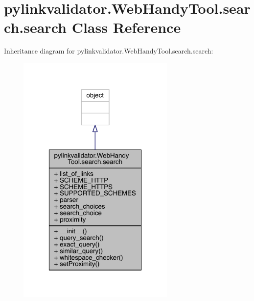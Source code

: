 \hypertarget{classpylinkvalidator_1_1_web_handy_tool_1_1search_1_1search}{}\section{pylinkvalidator.\+Web\+Handy\+Tool.\+search.\+search Class Reference}
\label{classpylinkvalidator_1_1_web_handy_tool_1_1search_1_1search}


Inheritance diagram for pylinkvalidator.\+Web\+Handy\+Tool.\+search.\+search\+:
\nopagebreak
\begin{figure}[H]
\begin{center}
\leavevmode
\includegraphics[width=220pt]{classpylinkvalidator_1_1_web_handy_tool_1_1search_1_1search__inherit__graph}
\end{center}
\end{figure}


